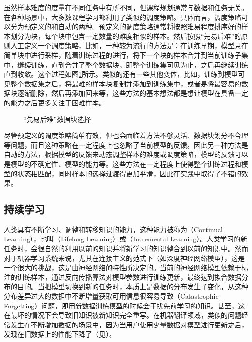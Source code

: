 \parinterval 虽然样本难度的度量在不同任务中有所不同，但课程规划通常与数据和任务无关。在各种场景中，大多数课程学习都利用了类似的调度策略。具体而言，调度策略可以分为预定义的和自动的两种。预定义的调度策略通常将按照难易程度排序好的样本划分为块，每个块中包含一定数量的难度相似的样本。然后按照“先易后难”的原则人工定义一个调度策略，比如，一种较为流行的方法是：在训练早期，模型只在简单块中进行采样，随着训练过程的进行，将下一个块的样本合并到当前训练子集中，继续训练，直到合并了整个数据块，即整个训练集可见为止，之后再继续训练直到收敛。这个过程如图\ref{fig:13-15}所示。类似的还有一些其他变体，比如，训练到模型可见整个数据集之后，将最难的样本块复制并添加到训练集中，或者是将最容易的数据块逐渐删除，然后再添加回来等，这些方法的基本想法都是想让模型在具备一定的能力之后更多关注于困难样本。

\begin{figure}[htp]
\centering

\caption{“先易后难”数据块选择}
\label{fig:13-15}
\end{figure}

\parinterval 尽管预定义的调度策略简单有效，但也会面临着方法不够灵活、数据块划分不合理等问题，而且这种策略在一定程度上也忽略了当前模型的反馈。因此另一种方法是自动的方法，根据模型的反馈来动态调整样本的难度或调度策略，模型的反馈可以是模型的不确定性、模型的能力等。这些方法在一定程度上使得整个训练过程和模型的状态相匹配，同时样本的选择过渡得更加平滑，因此在实践中取得了不错的效果。


\subsection{持续学习}

\parinterval 人类具有不断学习、调整和转移知识的能力，这种能力被称为{\small{}}（Continual Learning），也叫{\small{}}（Lifelong Learning）或{\small{}}（Incremental Learning）。人类学习的新任务时，会很自然的利用以前的知识并将新学习的知识整合到以前的知识中。然而对于机器学习系统来说，尤其在连接主义的范式下（如深度神经网络模型），这是一个很大的挑战，这是由神经网络的特性所决定的。当前的神经网络模型依赖于标注的训练样本，通过反向传播算法对模型参数进行训练更新，最终达到拟合数据分布的目的。当把模型切换到新的任务时，本质上是数据的分布发生了变化，从这种分布差异过大的数据中不断增量获取可用信息很容易导致{\small{}}（Catastrophic Forgetting）问题，即用新数据训练模型的时候会干扰先前学习的知识。甚至，这在最坏的情况下会导致旧知识被新知识完全重写。在机器翻译领域，类似的问题经常发生在不断增加数据的场景中，因为当用户使用少量数据对模型进行更新之后，发现在旧数据上的性能下降了（见{\chaptereighteen}）。

